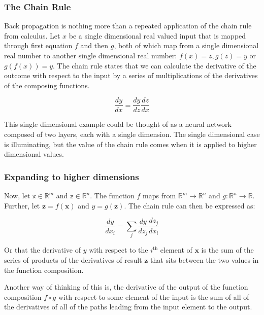 \documentclass[]{book}
\theoremstyle{definition}
\theoremstyle{definition}
\theoremstyle{definition}
\theoremstyle{remark}
\begin{document}
\subsubsection{The Chain Rule}\label{the-chain-rule}

Back propagation is nothing more than a repeated application of the
chain rule from calculus. Let \(x\) be a single dimensional real valued
input that is mapped through first equation \(f\) and then \(g\), both
of which map from a single dimensional real number to another single
dimensional real number: \(f(x) = z, g(z) = y\) or \(g(f(x)) = y\). The
chain rule states that we can calculate the derivative of the outcome
with respect to the input by a series of multiplications of the
derivatives of the composing functions.

\begin{equation} 
  \frac{dy}{dx} = \frac{dy}{dz}\frac{dz}{dx}
  \label{eq:chainrule}
\end{equation}

This single dimensional example could be thought of as a neural network
composed of two layers, each with a single dimension. The single
dimensional case is illuminating, but the value of the chain rule comes
when it is applied to higher dimensional values.

\subsubsection{Expanding to higher
dimensions}\label{expanding-to-higher-dimensions}

Now, let \(\mathbb{x} \in \mathbb{R}^m\) and
\(\mathbb{z} \in \mathbb{R}^n\). The function \(f\) maps from
\(\mathbb{R}^m \to \mathbb{R}^n\) and
\(g: \mathbb{R}^n \to \mathbb{R}\). Further, let
\(\textbf{z} = f(\textbf{x})\) and \(y = g(\textbf{z})\). The chain rule
can then be expressed as:

\begin{equation} 
  \frac{dy}{dx_i} = \sum_{j}\frac{dy}{dz_j}\frac{dz_j}{dx_i}
  \label{eq:chainrulemv}
\end{equation}

Or that the derivative of \(y\) with respect to the \(i^{\text{th}}\)
element of \(\textbf{x}\) is the sum of the series of products of the
derivatives of result \(\textbf{z}\) that sits between the two values in
the function composition.

Another way of thinking of this is, the derivative of the output of the
function composition \(f \circ g\) with respect to some element of the
input is the sum of all of the derivatives of all of the paths leading
from the input element to the output.
\end{document}

